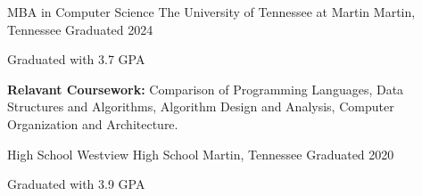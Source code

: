 
\begin{cventries}
  \cventry
    {MBA in Computer Science} %
    {The University of Tennessee at Martin} %
    {Martin, Tennessee} %
    {Graduated 2024} %
    {
      \begin{cvitems} %
        \item {Graduated with 3.7 GPA}
        \item {\textbf{Relavant Coursework:} Comparison of Programming Languages, Data Structures and Algorithms, Algorithm Design and Analysis, Computer Organization and Architecture.} 
      \end{cvitems}
    }
    
  \vspace{1em}
  
  \cventry
    {High School} %
    {Westview High School} %
    {Martin, Tennessee} %
    {Graduated 2020} %
    {
      \begin{cvitems} %
        \item {Graduated with 3.9 GPA}
      \end{cvitems}
    }

\end{cventries}

